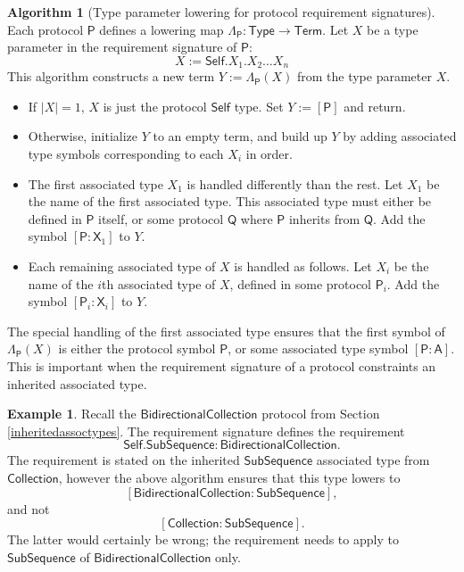 \documentclass[a4paper,headsepline,bibliography=totoc,toc=flat,fleqn,twoside=semi]{scrbook}
\theoremstyle{definition}
\theoremstyle{definition}
\newtheorem{example}{Example}[chapter]
\theoremstyle{definition}
\newtheorem{algorithm}{Algorithm}[chapter]
\newcommand{\namesym}[1]{\mathsf{#1}}
\newcommand{\genericparam}[1]{\bm{\mathsf{#1}}}
\newcommand{\proto}[1]{\bm{\mathsf{#1}}}
\newcommand{\protosym}[1]{[\proto{#1}]}
\newcommand{\assocsym}[2]{[\proto{#1}\colon\namesym{#2}]}
\begin{document}
\begin{algorithm}[Type parameter lowering for protocol requirement signatures]\label{lowertypeinproto}
Each protocol $\proto{P}$ defines a lowering map $\Lambda_{\proto{P}}\colon\namesym{Type}\rightarrow\namesym{Term}$. Let $X$ be a type parameter in the requirement signature of $\proto{P}$:
\[X:=\genericparam{Self}.X_1.X_2\ldots X_n\]
This algorithm constructs a new term $Y:=\Lambda_{\proto{P}}(X)$ from the type parameter $X$.
\begin{itemize}
\item
{}
If $|X|=1$, $X$ is just the protocol $\genericparam{Self}$ type. Set $Y:=\protosym{P}$ and return.
\item
{}
Otherwise, initialize $Y$ to an empty term, and build up $Y$ by adding associated type symbols corresponding to each $X_i$ in order.
\item
The first associated type $X_1$ is handled differently than the rest. Let $X_1$ be the name of the first associated type. This associated type must either be defined in $\proto{P}$ itself, or some protocol $\proto{Q}$ where $\proto{P}$ inherits from $\proto{Q}$. Add the symbol $[\proto{P}\colon\namesym{X}_1]$ to $Y$.
\item
Each remaining associated type of $X$ is handled as follows. Let $X_i$ be the name of the $i$th associated type of $X$, defined in some protocol $\proto{P}_i$. Add the symbol $[\proto{P}_i\colon\namesym{X}_i]$ to $Y$.
\end{itemize}
\end{algorithm}
The special handling of the first associated type ensures that the first symbol of $\Lambda_{\proto{P}}(X)$ is either the protocol symbol $\proto{P}$, or some associated type symbol $\assocsym{P}{A}$. This is important when the requirement signature of a protocol constraints an inherited associated type.
\begin{example} 
Recall the $\proto{BidirectionalCollection}$ protocol from Section \ref{inheritedassoctypes}. The requirement signature defines the requirement
\[\genericparam{Self}.\namesym{SubSequence}\colon\proto{BidirectionalCollection}.\]
The requirement is stated on the inherited $\namesym{SubSequence}$ associated type from $\proto{Collection}$, however the above algorithm ensures that this type lowers to
\[\assocsym{BidirectionalCollection}{SubSequence},\]
and not
\[\assocsym{Collection}{SubSequence}.\]
The latter would certainly be wrong; the requirement needs to apply to $\namesym{SubSequence}$ of $\proto{BidirectionalCollection}$ only.
\end{example}
\end{document}
